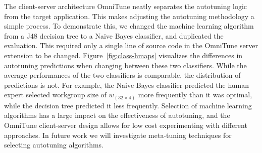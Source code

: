 The client-server architecture OmniTune neatly separates the
autotuning logic from the target application. This makes adjusting the
autotuning methodology a simple process. To demonstrate this, we
changed the machine learning algorithm from a J48 decision tree to a
Naive Bayes classifier, and duplicated the evaluation. This required
only a single line of source code in the OmniTune server extension to
be changed. Figure~\ref{fig:class-hmaps} visualizes the differences in
autotuning predictions when changing between these two
classifiers. While the average performances of the two classifiers is
comparable, the distribution of predictions is not. For example, the
Naive Bayes classifier predicted the human expert selected workgroup
size of $w_{(32 \times 4)}$ more frequently than it was optimal, while
the decision tree predicted it less frequently. Selection of machine
learning algorithms has a large impact on the effectiveness of
autotuning, and the OmniTune client-server design allows for low cost
experimenting with different approaches. In future work we will
investigate meta-tuning techniques for selecting autotuning
algorithms.

